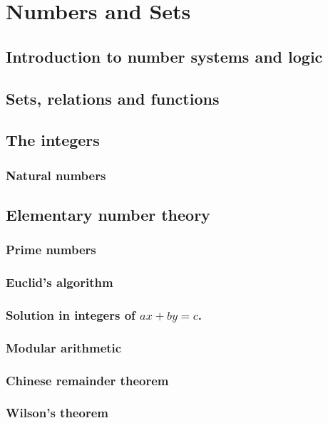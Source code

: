 \documentclass[main.tex]{subfiles}
\begin{document}
	\chapter{Numbers and Sets}
	
	\section{Introduction to number systems and logic}
	
	\section{Sets, relations and functions}
	
	\section{The integers}
		\subsection{Natural numbers}
	\section{Elementary number theory}
		\subsection{Prime numbers}
		
		\subsection{Euclid's algorithm}
		
		\subsection{Solution in integers of $ax + by = c$.}
		
		\subsection{Modular arithmetic}
		
		\subsection{Chinese remainder theorem}
		
		\subsection{Wilson's theorem}
		
\end{document}
